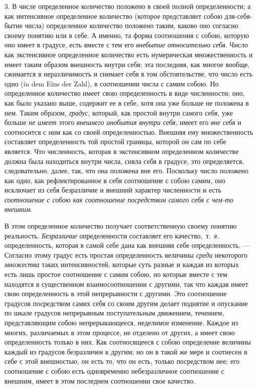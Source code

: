3. В числе определенное количество положено в своей полной определенности; а
как интенсивное определенное количество (которое представляет собою
для-себя-бытие числа) определенное количество положено таким, каково оно
согласно своему понятию или в себе. А именно, та форма соотношения с собою,
которую оно имеет в градусе, есть вместе с тем его
{\em внебытие относительно себя}. Число как
экстенсивное определенное количество есть нумерическая множественность и
имеет таким образом внешность внутри себя; эта последняя, как многое
вообще, сжимается в неразличимость и снимает себя в том обстоятельстве, что
число есть одно (in dem Eins der Zahl), в соотношении числа с самим собою.
Но определенное количество имеет свою определенность в виде численности;
оно, как было указано выше, содержит ее в себе, хотя она уже больше не
положена в нем. Таким образом, {\em градус}, который,
как простой внутри самого себя, уже больше {\em не
имеет} этого {\em внешнего инобытия внутри себя}, имеет
его {\em вне себя} и соотносится с ним как со своей
определенностью. Внешняя ему множественность составляет определенность той
простой границы, которой он сам по себе является. Что численность, которая
в экстенсивном определенном количестве должна была находиться внутри числа,
сняла себя в градусе, это определяется, следовательно, далее, так, что она
положена вне его. Поскольку число положено как одно, как рефлектированное в
себя соотношение с собою самим, оно исключает из себя безразличие и внешний
характер численности и есть {\em соотношение с собою
как соотношение посредством самого себя с чем-то внешним}.

В этом определенное количество получает соответственную своему понятию
реальность. {\em Безразличие} определенности составляет
его качество,~т.~е. определенность, которая в самой себе дана как внешняя
себе определенность. — Согласно этому градус есть простая определенность
величины {\em среди} некоторого
{\em множества} таких интенсивностей, которые суть
разные и каждая из которых есть лишь простое соотношение с самим собою, но
которые вместе с тем находятся в существенном взаимосоотношении с другими,
так что каждая имеет свою определенность в этой непрерывности с другими.
Это соотношение градусов посредством самих себя со своим другим делает
поднятие и опускание по шкале градусов непрерывным поступательным
движением, течением, представляющим собою непрерывающееся, неделимое
изменение. Каждое из многих, различаемых в этом процессе, не отделено от
других, а имеет свою определенность только в них. Как соотносящееся с собою
определение величины каждый из градусов безразличен к другим; но он в такой
же мере и соотнесен в себе с этой внешностью, он есть то, что он есть,
только посредством нее; его соотношение с собою есть одновременно
небезразличное соотношение с внешним, имеет в этом последнем соотношении
свое качество.


